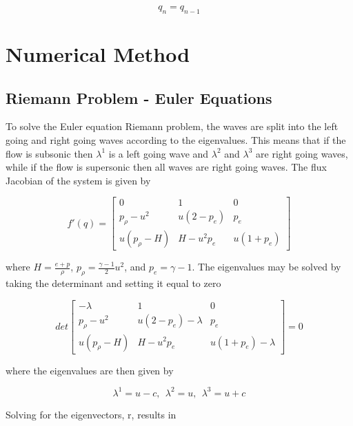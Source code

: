 \documentclass{article}%
\numberwithin{equation}{section}
\begin{document}
\begin{equation}
q_n  =  q_{n-1}
\end{equation}

\section{Numerical Method}
\subsection{Riemann Problem - Euler Equations}
To solve the Euler equation Riemann problem, the waves are split into the left going and right going waves according to the eigenvalues. This means that if the flow is subsonic then $\lambda^1$ is a left going wave and $\lambda^2$ and $\lambda^3$ are right going waves, while if the flow is supersonic then all waves are right going waves. The flux Jacobian of the system is given by

\begin{equation}
f'(q) = \left[ \begin{array}{ccc} 0 & 1 & 0 \\ p_{\rho} - u^2 &  u(2 - p_e) &  p_e \\  u(p_\rho - H) & H - u^2 p_e  &  u(1 + p_e) \end{array} \right] \label{1deulerjacobian}
\end{equation}

where $H = \frac{e + p}{\rho}$, $p_\rho = \frac{\gamma - 1}{2} u^2 $, and $p_e = \gamma - 1$. The eigenvalues may be solved by taking the determinant and setting it equal to zero

\begin{equation}
det \left[ \begin{array}{ccc} -\lambda & 1 & 0 \\ p_{\rho} - u^2 &  u(2 - p_e) - \lambda &  p_e \\  u(p_\rho - H) & H - u^2 p_e  &  u(1 + p_e) - \lambda \end{array} \right] = 0
\end{equation}

where the eigenvalues are then given by 

\begin{equation}
\lambda^1 = u - c,  \ \ \lambda^2 =u , \ \ \lambda^3 = u + c \label{eigval}
\end{equation}

Solving for the eigenvectors, r, results in
\end{document}
